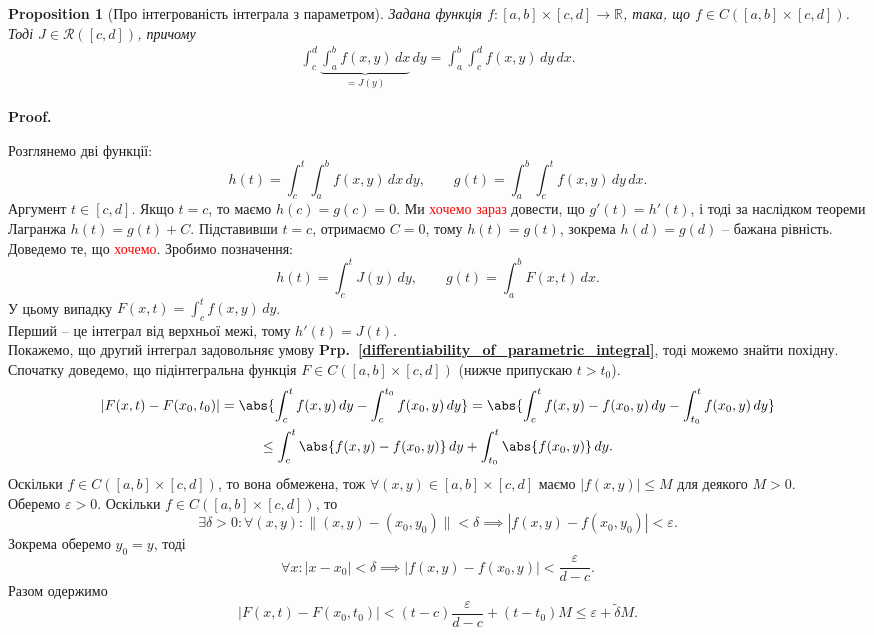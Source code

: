 \documentclass[a4paper, 10pt]{article}
\makeatletter
\theoremstyle{theoremdd}
\theoremstyle{theoremdd}
\theoremstyle{theoremdd}
\theoremstyle{theoremdd}
\theoremstyle{theoremdd}
\theoremstyle{theoremdd}
\newtheorem{proposition}[theorem]{Proposition}
\theoremstyle{theoremdd}
\theoremstyle{theoremdd}
\theoremstyle{theoremdd}
\newcommand\prpref[1]{\textbf{Prp.~\ref{#1}}}
\renewenvironment{proof}[1][Proof.\\]{\par
\pushQED{\hfill \qed}%
\normalfont \topsep6\p@\@plus6\p@\relax
\trivlist
\item\relax
{\bfseries
#1\@addpunct{.}}\hspace\labelsep\ignorespaces
}{%
\popQED\endtrivlist\@endpefalse
}
\makeatother
\begin{document}
\begin{proposition}[Про інтегрованість інтеграла з параметром]
Задана функція $f \colon [a,b] \times [c,d] \to \mathbb{R}$, така, що $f \in C([a,b] \times [c,d])$. Тоді $J \in \mathcal{R}([c,d])$, причому
\begin{align*}
\int_c^d \underbrace{\int_a^b f(x,y)\,dx}_{=J(y)}\,dy = \int_a^b \int_c^d f(x,y)\,dy \,dx.
\end{align*}
\end{proposition}

\begin{proof}
Розглянемо дві функції:
\[
h(t) = \int_c^t \int_a^b f(x,y) \,dx \,dy, \qquad g(t) = \int_a^b \int_c^t f(x,y)\,dy\,dx.
\]
Аргумент $t \in [c,d]$. Якщо $t = c$, то маємо $h(c) = g(c) = 0$. Ми \textcolor{red}{хочемо зараз} довести, що $g'(t) = h'(t)$, і тоді за наслідком теореми Лагранжа $h(t) = g(t) + C$. Підставивши $t = c$, отримаємо $C = 0$, тому $h(t) = g(t)$, зокрема $h(d) = g(d)$ -- бажана рівність.\\
Доведемо те, що \textcolor{red}{хочемо}. Зробимо позначення: 
\[
h(t) = \int_c^t J(y) \,dy, \qquad g(t) = \int_a^b F(x,t)\,dx.
\]
У цьому випадку $F(x,t) = \displaystyle\int_c^t f(x,y)\,dy$.\\
Перший -- це інтеграл від верхньої межі, тому $h'(t) = J(t)$.\\
Покажемо, що другий інтеграл задовольняє умову \prpref{differentiability_of_parametric_integral}, тоді можемо знайти похідну. Спочатку доведемо, що підінтегральна функція $F \in C([a,b] \times [c,d])$ (нижче припускаю $t > t_0$).
\begin{multline*}
\left|F(x,t) - F(x_0,t_0)\right| = \abs{\int_c^t f(x,y)\,dy - \int_c^{t_0} f(x_0,y)\,dy} = \abs{\int_c^t f(x,y)-f(x_0,y)\,dy - \int_{t_0}^t f(x_0,y)\,dy} \\
\leq \int_c^t \abs{ f(x,y) - f(x_0,y) }\,dy + \int_{t_0}^t \abs{f(x_0,y)}\,dy.
\end{multline*}
Оскільки $f \in C([a,b] \times [c,d])$, то вона обмежена, тож $\forall (x,y) \in [a,b] \times [c,d]$ маємо $|f(x,y)| \leq M$ для деякого $M>0$.\\
Оберемо $\varepsilon > 0$. Оскільки $f \in C([a,b] \times [c,d])$, то 
\[
\exists \delta > 0: \forall (x,y): \| (x,y) - (x_0,y_0) \| < \delta \implies |f(x,y) - f(x_0,y_0)| < \varepsilon.
\]
Зокрема оберемо $y_0 = y$, тоді 
\[
\forall x: |x-x_0| < \delta \implies |f(x,y) - f(x_0,y)| < \dfrac{\varepsilon}{d-c}.
\]
Разом одержимо 
\[
|F(x,t) - F(x_0,t_0)| < (t-c) \dfrac{\varepsilon}{d-c} + (t-t_0) M \leq \varepsilon + \tilde{\delta} M.
\]
\end{proof}
\end{document}
